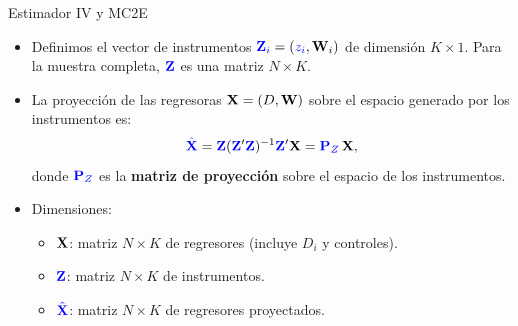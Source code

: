 \documentclass[10pt, xcolor=dvipsnames]{beamer}
\begin{document}
\begin{frame}{Estimador IV y MC2E}\label{DIAP:DEMOS-MC2E}
\begin{itemize}
    \item Definimos el vector de instrumentos \(\textcolor{blue}{\textbf{Z}_i} = (\textcolor{blue}{z_i}, \textbf{W}_i)\) de dimensión $K \times 1$. Para la muestra completa, $\textcolor{blue}{\textbf{Z}}$ es una matriz $N \times K$.
    \smallspace
    \item La proyección de las regresoras $\textbf{X} = (D, \textbf{W})$ sobre el espacio generado por los instrumentos es:
    \[
        \textcolor{blue}{\hat{\textbf{X}}} = \textcolor{blue}{\textbf{Z}} (\textcolor{blue}{\textbf{Z}}'\textcolor{blue}{\textbf{Z}})^{-1}\textcolor{blue}{\textbf{Z}}'\textbf{X} 
        = \textcolor{blue}{\textbf{P}_Z}\,\textbf{X},
    \]
    donde $\textcolor{blue}{\textbf{P}_Z}$ es la \textbf{matriz de proyección} sobre el espacio de los instrumentos.    
    \vspace{0.3cm}
    \item Dimensiones:
    \begin{itemize}
        \item $\textbf{X}$: matriz $N \times K$ de regresores (incluye $D_i$ y controles).
        \item $\textcolor{blue}{\textbf{Z}}$: matriz $N \times K$ de instrumentos.
        \item $\textcolor{blue}{\hat{\textbf{X}}}$: matriz $N \times K$ de regresores proyectados.
    \end{itemize}
\end{itemize}
\end{frame}
\end{document}

